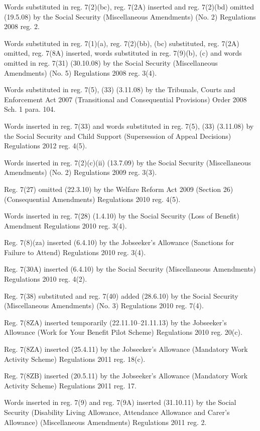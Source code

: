 \documentclass[12pt,a4paper]{article}
\begin{document}
{Words substituted in reg. 7(2)(bc), reg. 7(2A) inserted and reg. 7(2)(bd) omitted (19.5.08) by the Social Security (Miscellaneous Amendments) (No. 2) Regulations 2008 reg. 2.

Words substituted in reg. 7(1)(a), reg. 7(2)(bb), (bc) substituted, reg. 7(2A) omitted, reg. 7(8A) inserted, words substituted in reg. 7(9)(b), (c) and words omitted in reg. 7(31) (30.10.08) by the Social Security (Miscellaneous Amendments) (No. 5) Regulations 2008 reg. 3(4).

Words substituted in reg. 7(5), (33) (3.11.08) by the Tribunals, Courts and Enforcement Act 2007 (Transitional and Consequential Provisions) Order 2008 Sch. 1 para. 104.

Words inserted in reg. 7(33) and words substituted in reg. 7(5), (33) (3.11.08) by the Social Security and Child Support (Supersession of Appeal Decisions) Regulations 2012 reg. 4(5).

Words inserted in reg. 7(2)(c)(ii) (13.7.09) by the Social Security (Miscellaneous Amendments) (No. 2) Regulations 2009 reg. 3(3).

Reg. 7(27) omitted (22.3.10) by the Welfare Reform Act 2009 (Section 26) (Consequential Amendments) Regulations 2010 reg. 4(5).

Words inserted in reg. 7(28) (1.4.10) by the Social Security (Loss of Benefit) Amendment Regulations 2010 reg. 3(4).

Reg. 7(8)(za) inserted (6.4.10) by the Jobseeker’s Allowance (Sanctions for Failure to Attend) Regulations 2010 reg. 3(4).

Reg. 7(30A) inserted (6.4.10) by the Social Security (Miscellaneous Amendments) Regulations 2010 reg. 4(2).

Reg. 7(38) substituted and reg. 7(40) added (28.6.10) by the Social Security (Miscellaneous Amendments) (No. 3) Regulations 2010 reg. 7(4).

Reg. 7(8ZA) inserted temporarily (22.11.10--21.11.13) by the Jobseeker’s Allowance (Work for Your Benefit Pilot Scheme) Regulations 2010 reg. 20(c).

Reg. 7(8ZA) inserted (25.4.11) by the Jobseeker’s Allowance (Mandatory Work Activity Scheme) Regulations 2011 reg. 18(c).

Reg. 7(8ZB) inserted (20.5.11) by the Jobseeker’s Allowance (Mandatory Work Activity Scheme) Regulations 2011 reg. 17.

Words inserted in reg. 7(9) and reg. 7(9A) inserted (31.10.11) by the Social Security (Disability Living Allowance, Attendance Allowance and Carer's Allowance) (Miscellaneous Amendments) Regulations 2011 reg. 2.

}
\end{document}
